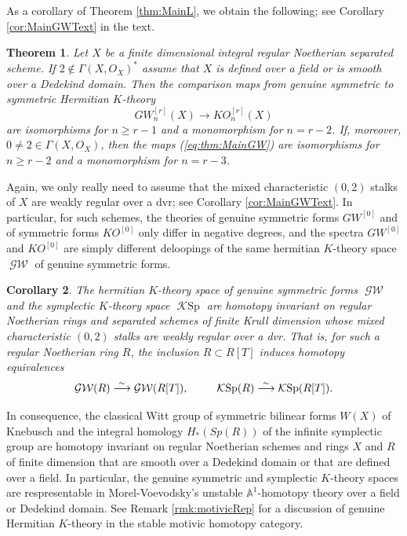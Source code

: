\documentclass[10pt,twoside,a4paper,reqno]{amsart}
\newtheorem{theorem}{Theorem}[section]
\newtheorem{corollary}[theorem]{Corollary}
\theoremstyle{definition}
\numberwithin{equation}{section}
\newcommand{\aaa}{\mathbb{A}}
\newcommand{\GW}{\operatorname{\mathcal{GW}}}
\newcommand{\KSp}{\operatorname{\mathcal{K}Sp}}
\renewcommand{\|}{\operatorname{|}}
\begin{document}
As a corollary of Theorem \ref{thm:MainL}, we obtain the following; see Corollary \ref{cor:MainGWText} in the text.

\begin{theorem}
\label{thm:MainGW}
Let $X$ be a finite dimensional integral regular Noetherian separated scheme.
If $2 \notin \Gamma(X,O_X)^*$ assume that $X$ is defined over a field or is smooth over a Dedekind domain.
Then the comparison maps from genuine symmetric to symmetric Hermitian $K$-theory
\begin{equation}
\label{eq:thm:MainGW}
GW^{[r]}_n(X) \to KO^{[r]}_n(X)
\end{equation}
are isomorphisms for $n \geq r-1$ and a monomorphism for $n=r-2$.
If, moreover, $0\neq 2 \in \Gamma(X,O_X)$, then the maps (\ref{eq:thm:MainGW}) are isomorphisms for $n \geq r-2$ and a monomorphism for $n=r-3$.
\end{theorem}

Again, we only really need to assume that the mixed characteristic $(0,2)$ stalks of $X$ are weakly regular over a dvr; see Corollary \ref{cor:MainGWText}.
In particular, for such schemes, the theories of genuine symmetric forms $GW^{[0]}$ and of symmetric forms $KO^{[0]}$ only differ in negative degrees, and the spectra $GW^{[0]}$ and $KO^{[0]}$ are simply different deloopings of the same hermitian $K$-theory space $\GW$ of genuine symmetric forms.

\begin{corollary}
\label{cor:htpyInv}
The hermitian $K$-theory space of genuine symmetric forms $\GW$ and the symplectic $K$-theory space $\KSp$ are homotopy invariant on regular Noetherian rings and separated schemes of finite Krull dimension whose mixed characteristic $(0,2)$ stalks are weakly regular over a dvr.
That is,
for such a regular Noetherian ring $R$, the inclusion $R \subset R[T]$ induces homotopy equivalences
$$\GW(R) \stackrel{\sim}{\longrightarrow} \GW(R[T]),\hspace{6ex} \KSp(R) \stackrel{\sim}{\longrightarrow} \KSp(R[T]).$$
\end{corollary}

In consequence, the classical Witt group of symmetric bilinear forms $W(X)$ of Knebusch \cite{Knebusch} and the integral homology $H_*(Sp(R))$ of the infinite symplectic group are homotopy invariant on regular Noetherian schemes and rings $X$ and $R$ of finite dimension that are smooth over a Dedekind domain or that are defined over a field.
In particular, the genuine symmetric and symplectic $K$-theory spaces are respresentable in Morel-Voevodsky's unstable $\aaa^1$-homotopy theory over a field or Dedekind domain.
See Remark \ref{rmk:motivicRep} for a discussion of genuine Hermitian $K$-theory in the stable motivic homotopy category.
\vspace{2ex}
\end{document}
